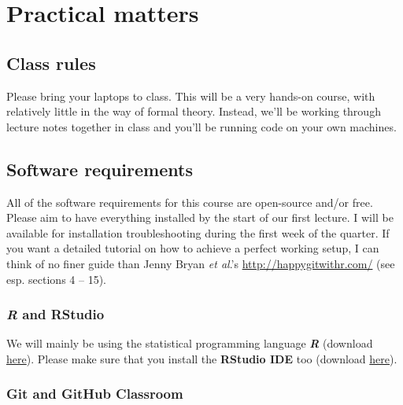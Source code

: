 \documentclass[12]{article}
\begin{document}
\newpage

\section*{Practical matters}

\subsection*{Class rules}

Please bring your laptops to class. This will be a very hands-on course, with relatively little in the way of formal theory. Instead, we'll be working through lecture notes together in class and you'll be running code on your own machines. 

\subsection*{Software requirements}

All of the software requirements for this course are open-source and/or free. Please aim to have everything installed by the start of our first lecture. I will be available for installation troubleshooting during the first week of the quarter. If you want a detailed tutorial on how to achieve a perfect working setup, I can think of no finer guide than Jenny Bryan \textit{et al}.'s \url{http://happygitwithr.com/} (see esp. sections 4 -- 15).

\vspace{-0.25cm}
\subsubsection*{\textit{R} and RStudio}

We will mainly be using the statistical programming language \textbf{\textit{R}} (download \href{https://www.r-project.org/}{here}). %
Please make sure that you install the \textbf{RStudio IDE} too (download \href{https://www.rstudio.com/products/rstudio/download/preview/}{here}).

\vspace{-0.25cm}
\subsubsection*{Git and GitHub Classroom}
\end{document}
